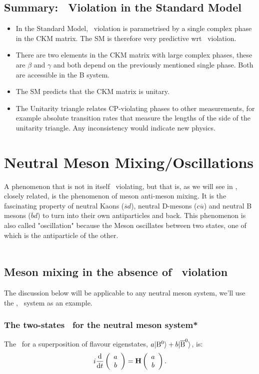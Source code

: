 \subsection{Summary: \cp\ Violation in the Standard Model}
 \begin{itemize}
 \item In the Standard Model, \cp\ violation is parametrised by a
 single complex phase in the CKM matrix. The SM is therefore very
 predictive wrt \cp\ violation.
 \item There are two elements in the CKM matrix with large complex
 phases, these are $\beta$ and $\gamma$ and both depend on the
 previously mentioned single phase. Both are accessible in the B
 system.
 \item The SM predicts that the CKM matrix is unitary.
 \item The Unitarity triangle relates CP-violating phases to other
 measurements, for example absolute transition rates that measure the
 lengths of the side of the unitarity triangle. Any inconsistency
 would indicate new physics.
\end{itemize}

\section{Neutral Meson Mixing/Oscillations}
A phenomenon that is not in itself \cp\ violating, but that is, as we will see in , closely related, is the phenomenon of meson anti-meson mixing. It is the fascinating property of neutral Kaons ($\overline{s}d$), neutral D-mesons ($c\overline{u}$) and neutral B mesons ($\overline{b}d$) to turn into their own antiparticles and back. This phenomenon is also called "oscillation" because the Meson oscillates between two states, one of which is the antiparticle of the other.\\
\\

\subsection{Meson mixing in the absence of \cp\ violation}
The discussion below will be applicable to any neutral meson system, we'll use the \Bo, \Bob\ system as an example.

\subsubsection{The two-states \Se\ for the neutral meson system*}
\label{sec:details}
The \Se\ for a superposition of flavour eigenstates, $ a  | {\rm B^0} \rangle + b
 | {\rm \overline{B}^0} \rangle$, is:
\begin{equation}
\label{eq:th.a.se}
%
i\dbyd{}{t}\vII{a}{b}= \op{H} \vII{a}{b}.
%
\end{equation}\\
 

